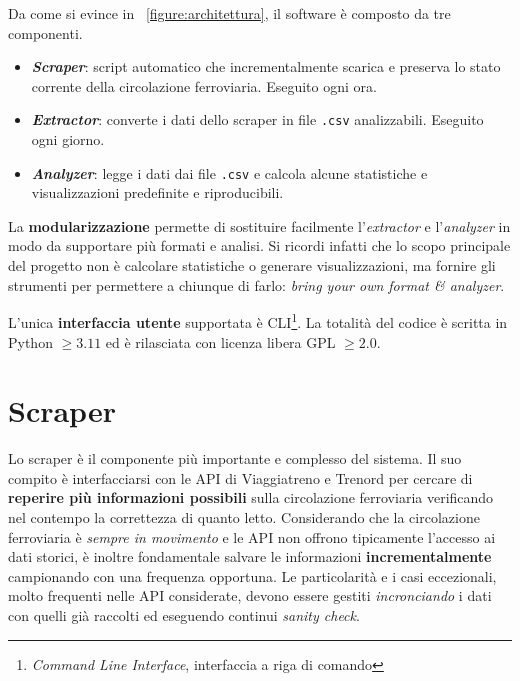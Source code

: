\documentclass[12pt,italian]{report}
\begin{document}
Da come si evince in \figurename~\ref{figure:architettura}, il
software è composto da tre componenti.
\begin{itemize}
    \item \textbf{\textit{Scraper}}: script automatico che
    incrementalmente scarica e preserva lo stato corrente della
    circolazione ferroviaria.  Eseguito ogni ora.
    \item \textbf{\textit{Extractor}}: converte i dati dello scraper
    in file \texttt{.csv} analizzabili.  Eseguito ogni giorno.
    \item \textbf{\textit{Analyzer}}: legge i dati dai file
    \texttt{.csv} e calcola alcune statistiche e visualizzazioni
    predefinite e riproducibili.
\end{itemize}

La \textbf{modularizzazione} permette di sostituire facilmente
l'\textit{extractor} e l'\textit{analyzer} in modo da supportare più
formati e analisi.  Si ricordi infatti che lo scopo principale del
progetto non è calcolare statistiche o generare visualizzazioni, ma
fornire gli strumenti per permettere a chiunque di farlo:
\textit{bring your own format \& analyzer}.

L'unica \textbf{interfaccia utente} supportata è
CLI\footnote{\textit{Command Line Interface}, interfaccia a riga di
    comando}.  La totalità del codice è scritta in Python $\geq 3.11$
ed è rilasciata con licenza libera GPL $\geq 2.0$.

\section{Scraper}
\label{scraper}

Lo scraper è il componente più importante e complesso del sistema.  Il
suo compito è interfacciarsi con le API di Viaggiatreno e Trenord per
cercare di \textbf{reperire più informazioni possibili} sulla
circolazione ferroviaria verificando nel contempo la correttezza di
quanto letto.  Considerando che la circolazione ferroviaria è
\textit{sempre in movimento} e le API non offrono tipicamente
l'accesso ai dati storici, è inoltre fondamentale salvare le
informazioni \textbf{incrementalmente} campionando con una frequenza
opportuna.
Le particolarità e i casi eccezionali, molto frequenti nelle API
considerate, devono essere gestiti \textit{incronciando} i dati con
quelli già raccolti ed eseguendo continui \textit{sanity check}.
\end{document}
